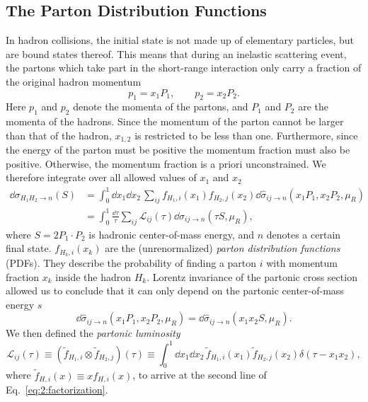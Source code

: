 \subsection{The Parton Distribution Functions}\label{subsec:PDFs}
In hadron collisions, the initial state is not made up of elementary particles, but are bound states thereof. This means that during an inelastic scattering event, the partons which take part in the short-range interaction only carry a fraction of the original hadron momentum
\begin{equation}
p_1 = x_1 P_1, \qquad p_2 = x_2 P_2.
\end{equation}
Here $p_1$ and $p_2$ denote the momenta of the partons, and $P_1$ and $P_2$ are the momenta of the hadrons. Since the momentum of the parton cannot be larger than that of the hadron, $x_{1,2}$ is restricted to be less than one. Furthermore, since the energy of the parton must be positive the momentum fraction must also be positive. Otherwise, the momentum fraction is a priori unconstrained. We therefore integrate over all allowed values of $x_1$ and $x_2$
\begin{equation}
\begin{split}
\dd \sigma_{H_1 H_2 \rightarrow n}(S) &=  \int_0^1 \dd x_1 \dd x_2 \, \sum_{ij} f_{H_1,i}(x_1) f_{H_2, j}(x_2) \dd \hat{\sigma}_{ij \rightarrow n}(x_1 P_1, x_2 P_2, \mu_R) \\
&= \int_0^1 \frac{\dd \tau}{\tau} \sum_{ij} \mathcal{L}_{ij}(\tau) \dd \hat{\sigma}_{ij \rightarrow n}\!\left(\tau S, \mu_R \right),
\end{split}
\label{eq:2:factorization}
\end{equation}
where $S =2 P_1 \cdot P_2$ is hadronic center-of-mass energy, and $n$ denotes a certain final state. $f_{H_{k}, i}(x_k)$ are the (unrenormalized) \textit{parton distribution functions} (\acs{PDF}s). They describe the probability of finding a parton $i$ with momentum fraction $x_k$ inside the hadron $H_k$. Lorentz invariance of the partonic cross section allowed us to conclude that it can only depend on the partonic center-of-mass energy $s$
\begin{equation}
\dd \hat{\sigma}_{ij \rightarrow n} (x_1 P_1, x_2 P_2, \mu_R) = \dd \hat{\sigma}_{ij \rightarrow n}(x_1 x_2 S, \mu_R).
\end{equation}
We then defined the \textit{partonic luminosity}
\begin{equation}
\mathcal{L}_{ij}(\tau) \equiv  (\tilde{f}_{H_1,i} \otimes \tilde{f}_{H_2,j})(\tau) \equiv \int_0^1 \dd x_1 \dd x_2 \, \tilde{f}_{H_1,i}(x_1) \tilde{f}_{H_2, j}(x_2) \delta(\tau - x_1 x_2),
\end{equation}
where $\tilde{f}_{H, i}(x) \equiv x f_{H, i}(x)$, to arrive at the second line of Eq.~\eqref{eq:2:factorization}.

